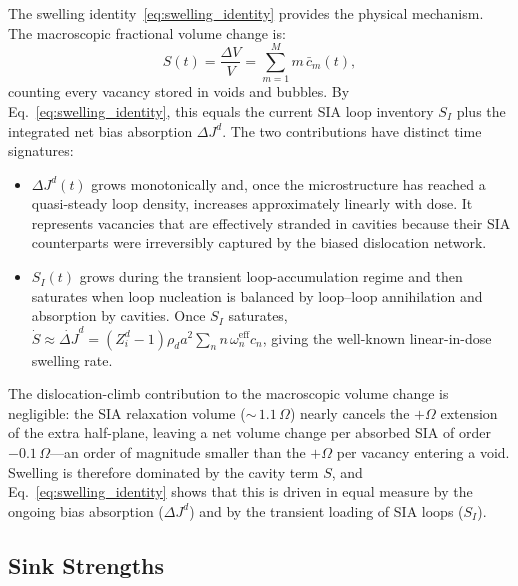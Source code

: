 \documentclass[pdflatex,sn-basic]{sn-jnl} %
\begin{document}
The swelling identity~\eqref{eq:swelling_identity} provides the
physical mechanism. The macroscopic fractional volume change is:
\begin{equation}\label{eq:swelling}
    S(t) = \frac{\Delta V}{V} = \sum_{m=1}^{M} m\,\bar{c}_m(t),
\end{equation}
counting every vacancy stored in voids and bubbles. By
Eq.~\eqref{eq:swelling_identity}, this equals the current SIA loop
inventory $S_I$ plus the integrated net bias absorption $\Delta J^d$.
The two contributions have distinct time signatures:
\begin{itemize}
    \item $\Delta J^d(t)$ grows monotonically and, once the
    microstructure has reached a quasi-steady loop density, increases
    approximately linearly with dose. It represents vacancies that are
    effectively stranded in cavities because their SIA counterparts were
    irreversibly captured by the biased dislocation network.
    \item $S_I(t)$ grows during the transient loop-accumulation regime
    and then saturates when loop nucleation is balanced by loop--loop
    annihilation and absorption by cavities. Once $S_I$ saturates,
    $\dot{S} \approx \dot{\Delta J}^d = (Z_i^d - 1)\rho_d a^2
    \sum_n n\,\omega_n^{\mathrm{eff}} c_n$, giving the well-known
    linear-in-dose swelling rate.
\end{itemize}

The dislocation-climb contribution to the macroscopic volume change is
negligible: the SIA relaxation volume (${\sim}\,1.1\,\Omega$) nearly
cancels the $+\Omega$ extension of the extra half-plane, leaving a net
volume change per absorbed SIA of order $-0.1\,\Omega$---an order of
magnitude smaller than the $+\Omega$ per vacancy entering a void.
Swelling is therefore dominated by the cavity term $S$, and
Eq.~\eqref{eq:swelling_identity} shows that this is driven in equal
measure by the ongoing bias absorption ($\Delta J^d$) and by the
transient loading of SIA loops ($S_I$).


\subsection{Sink Strengths}
\label{sec:sink_strength}
\end{document}
